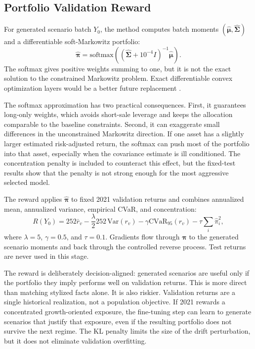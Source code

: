 \documentclass{article}
\newcommand{\bmu}{\boldsymbol{\mu}}
\newcommand{\bSigma}{\boldsymbol{\Sigma}}
\newcommand{\bpi}{\boldsymbol{\pi}}
\begin{document}
\subsection{Portfolio Validation Reward}

For generated scenario batch $Y_0$, the method computes batch moments
$(\hat{\bmu},\hat{\bSigma})$ and a differentiable soft-Markowitz portfolio:
\begin{equation}
  \hat{\bpi}
  =
  \mathrm{softmax}\left((\hat{\bSigma}+10^{-4}I)^{-1}\hat{\bmu}\right).
\end{equation}
The softmax gives positive weights summing to one, but it is not the exact
solution to the constrained Markowitz problem. Exact differentiable convex
optimization layers would be a better future replacement \citep{agrawal2019}.

The softmax approximation has two practical consequences. First, it guarantees
long-only weights, which avoids short-sale leverage and keeps the allocation
comparable to the baseline constraints. Second, it can exaggerate small
differences in the unconstrained Markowitz direction. If one asset has a
slightly larger estimated risk-adjusted return, the softmax can push most of the
portfolio into that asset, especially when the covariance estimate is ill
conditioned. The concentration penalty is included to counteract this effect,
but the fixed-test results show that the penalty is not strong enough for the
most aggressive selected model.

The reward applies $\hat{\bpi}$ to fixed 2021 validation returns and combines
annualized mean, annualized variance, empirical CVaR, and concentration:
\begin{equation}
  R(Y_0)
  =
  252\bar{r}_v
  -
  \frac{\lambda}{2}252\,\mathrm{Var}(r_v)
  -
  \gamma \mathrm{CVaR}_{95}(r_v)
  -
  \tau \sum_i \hat{\pi}_i^2,
\end{equation}
where $\lambda=5$, $\gamma=0.5$, and $\tau=0.1$. Gradients flow through
$\hat{\bpi}$ to the generated scenario moments and back through the controlled
reverse process. Test returns are never used in this stage.

The reward is deliberately decision-aligned: generated scenarios are useful only
if the portfolio they imply performs well on validation returns. This is more
direct than matching stylized facts alone. It is also riskier. Validation returns
are a single historical realization, not a population objective. If 2021 rewards
a concentrated growth-oriented exposure, the fine-tuning step can learn to
generate scenarios that justify that exposure, even if the resulting portfolio
does not survive the next regime. The KL penalty limits the size of the drift
perturbation, but it does not eliminate validation overfitting.
\end{document}
